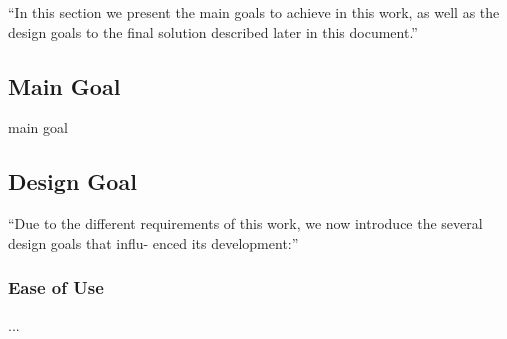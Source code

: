 ``In this section we present the main goals to achieve in this work, as well as the design goals to the final solution described later in this document.''


\subsection{Main Goal} %
\label{sub:main_goal}

main goal


\subsection{Design Goal} %
\label{sub:design_goal}

``Due to the different requirements of this work, we now introduce the several design goals that influ- enced its development:''

\subsubsection{Ease of Use} %
\label{ssub:ease_of_use}

...




